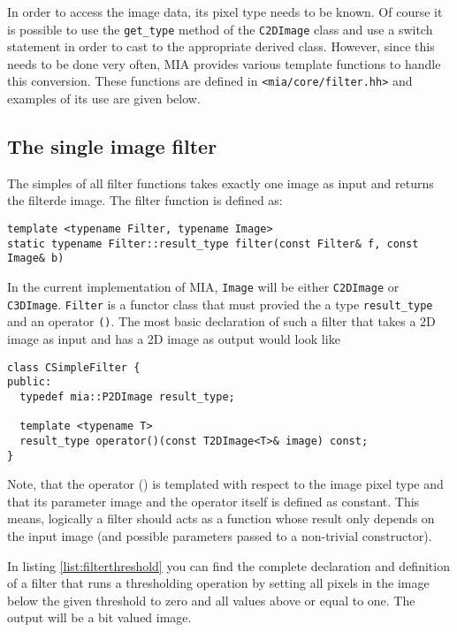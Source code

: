 \documentclass[english, 10pt, a4paper,headsepline,openany]{scrbook}
\begin{document}
In order to access the image data, its pixel type needs to be known. 
Of course it is possible to use the \texttt{get\_type} method of the \texttt{C2DImage} class and use
  a switch statement in order to cast to the appropriate derived class. 
However, since this needs to be done very often, MIA provides various template functions to handle 
  this conversion.
These functions are defined in \texttt{<mia/core/filter.hh>} and examples of its use are given below. 

\subsection{The single image filter}

The simples of all filter functions takes exactly one image as input and returns the filterde image. 
The filter function is defined as: 

\begin{lstlisting}
template <typename Filter, typename Image>
static typename Filter::result_type filter(const Filter& f, const Image& b)
\end{lstlisting}

In the current implementation of MIA, \texttt{Image} will be either \texttt{C2DImage} or \texttt{C3DImage}. 
\texttt{Filter} is a functor class that must provied the a type \texttt{result\_type} and an 
  operator \texttt{()}.
The most basic declaration of such a filter that takes a 2D image as input and has a 2D image as 
   output would look like 
\begin{lstlisting}
class CSimpleFilter {
public: 
  typedef mia::P2DImage result_type; 
  
  template <typename T> 
  result_type operator()(const T2DImage<T>& image) const; 
}
\end{lstlisting}

Note, that the operator () is templated with respect to the image pixel type and that its parameter image 
  and the operator itself is defined as constant. 
This means, logically a filter should acts as a function whose result only depends on the input image 
(and possible parameters passed to a non-trivial constructor). 

In listing \ref{list:filterthreshold} you can find the complete declaration and definition of a filter 
  that runs a thresholding operation by setting all pixels in the image below the given threshold to zero 
  and all values above or equal to one. 
The output will be a bit valued image. 
\end{document}
